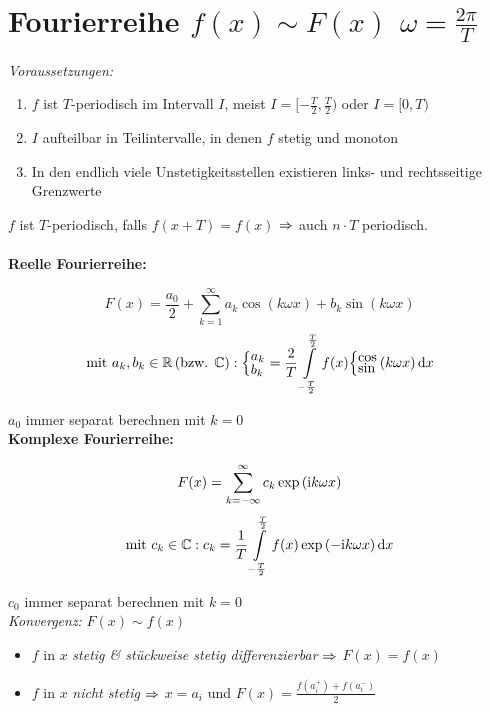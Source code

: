 \documentclass[german,color,5pt]{latex4ei/latex4ei_fs}
\begin{document}
\section{Fourierreihe \quad $f(x) \sim F(x)$ \qquad $\omega = \frac{2 \pi}{T}$}
\begin{sectionbox}
	\emph{Voraussetzungen:}
	\begin{enumerate}
		\item $f$ ist $T$-periodisch im Intervall $I$, meist $I=[-\frac{T}{2},\frac{T}{2})$ oder $I=[0,T)$
		\item $I$ aufteilbar in Teilintervalle, in denen $f$ stetig und monoton
		\item In den endlich viele Unstetigkeitsstellen existieren links- und rechtsseitige Grenzwerte
	\end{enumerate}
	$f$ ist $T$-periodisch, falls $f(x+T) = f(x)$ $\Rightarrow$ auch $n \cdot T$ periodisch.\\\\
	\textbf{Reelle Fourierreihe:}
	\begin{emphbox}\vspace{-5pt}
		\[F(x) = \frac{a_0}{2} + \sum\limits_{k=1}^\infty a_k \cos \left(k \omega x \right) + b_k \sin \left( k \omega x \right)\]
		\[\text{mit } a_k,b_k \in \R \text{(bzw. } \C\text{)}:\Big\{ { ^{\textstyle a_k}_{\textstyle b_k}} = \frac{2}{T} \int\limits_{-\frac{T}{2}}^{\frac{T}{2}} f(x) \Big\{ {}^{\textstyle \cos} _{\textstyle \sin} \left(k \omega x \right) \diff x\]
	\end{emphbox}
	$a_0$ immer separat berechnen mit $k=0$\\
	\textbf{Komplexe Fourierreihe:}
	\begin{emphbox}\vspace{-5pt}
		\[F(x) = \sum\limits_{k=-\infty}^\infty c_k \exp \left( \mathrm{i} k \omega x \right)\]
		\[\text{mit } c_k \in \C: c_k = \frac{1}{T} \int\limits_{-\frac{T}{2}}^{\frac{T}{2}} f(x) \exp \left( - \i k \omega x \right) \diff x\]
	\end{emphbox}	
	$c_0$ immer separat berechnen mit $k=0$\\
	\emph{Konvergenz:} $F(x) \sim f(x)$
	\begin{itemize}
		\item $f$ in $x$ \emph{stetig \& stückweise stetig differenzierbar} $\Rightarrow$ $F(x) = f(x)$
		\item $f$ in $x$ \emph{nicht stetig} $\Rightarrow$ $x = a_i$ und $F(x) = \frac{f(a_i^+) + f(a_i^-)}{2}$
	\end{itemize}
\end{sectionbox}
\end{document}
